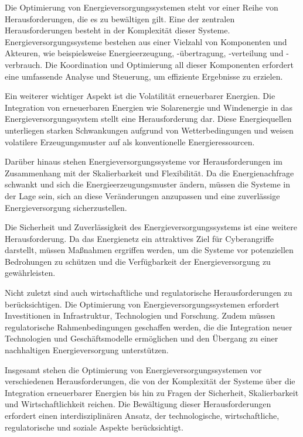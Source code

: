 Die Optimierung von Energieversorgungssystemen steht vor einer Reihe von
Herausforderungen, die es zu bewältigen gilt. Eine der zentralen
Herausforderungen besteht in der Komplexität dieser Systeme.
Energieversorgungssysteme bestehen aus einer Vielzahl von Komponenten und
Akteuren, wie beispielsweise Energieerzeugung, -übertragung, -verteilung und
-verbrauch. Die Koordination und Optimierung all dieser Komponenten erfordert
eine umfassende Analyse und Steuerung, um effiziente Ergebnisse zu erzielen.

Ein weiterer wichtiger Aspekt ist die Volatilität erneuerbarer Energien. Die
Integration von erneuerbaren Energien wie Solarenergie und Windenergie in das
Energieversorgungssystem stellt eine Herausforderung dar. Diese Energiequellen
unterliegen starken Schwankungen aufgrund von Wetterbedingungen und weisen
volatilere Erzeugungsmuster auf als konventionelle Energieressourcen.

Darüber hinaus stehen Energieversorgungssysteme vor Herausforderungen im
Zusammenhang mit der Skalierbarkeit und Flexibilität. Da die Energienachfrage
schwankt und sich die Energieerzeugungsmuster ändern, müssen die Systeme in der
Lage sein, sich an diese Veränderungen anzupassen und eine zuverlässige
Energieversorgung sicherzustellen.

Die Sicherheit und Zuverlässigkeit des Energieversorgungssystems ist eine
weitere Herausforderung. Da das Energienetz ein attraktives Ziel für
Cyberangriffe darstellt, müssen Maßnahmen ergriffen werden, um die Systeme vor
potenziellen Bedrohungen zu schützen und die Verfügbarkeit der
Energieversorgung zu gewährleisten.

Nicht zuletzt sind auch wirtschaftliche und regulatorische Herausforderungen zu
berücksichtigen. Die Optimierung von Energieversorgungssystemen erfordert
Investitionen in Infrastruktur, Technologien und Forschung. Zudem müssen
regulatorische Rahmenbedingungen geschaffen werden, die die Integration neuer
Technologien und Geschäftsmodelle ermöglichen und den Übergang zu einer
nachhaltigen Energieversorgung unterstützen.

Insgesamt stehen die Optimierung von Energieversorgungssystemen vor
verschiedenen Herausforderungen, die von der Komplexität der Systeme über die
Integration erneuerbarer Energien bis hin zu Fragen der Sicherheit,
Skalierbarkeit und Wirtschaftlichkeit reichen. Die Bewältigung dieser
Herausforderungen erfordert einen interdisziplinären Ansatz, der
technologische, wirtschaftliche, regulatorische und soziale Aspekte
berücksichtigt.
